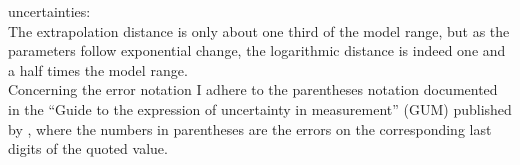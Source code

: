uncertainties:\\
The extrapolation distance is only about one third of the model range, but as the parameters follow exponential change, the logarithmic distance is indeed one and a half times the model range.\\

Concerning the error notation I adhere to the parentheses notation documented in the ``Guide to the expression of uncertainty in measurement'' (GUM) published by \citet{GUM2008}, where the numbers in parentheses are the errors on the corresponding last digits of the quoted value.\\


